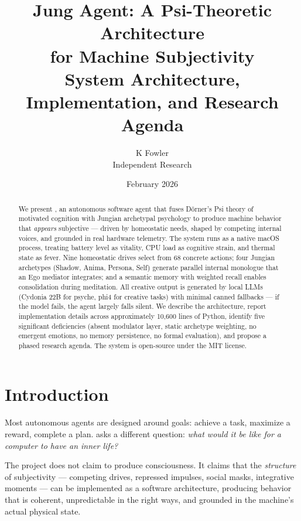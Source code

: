 \documentclass[11pt,oneside]{article}
\title{%
  \sffamily\bfseries
  \textcolor{jungblue}{Jung Agent: A Psi-Theoretic Architecture}\\[4pt]
  \textcolor{jungblue}{for Machine Subjectivity}\\[8pt]
  \large\textcolor{jungmuted}{System Architecture, Implementation, and Research Agenda}
}
\author{%
  \sffamily K Fowler\\
  \sffamily\small\textcolor{jungmuted}{Independent Research}
}
\date{\sffamily\textcolor{jungmuted}{February 2026}}
\begin{document}
\maketitle
\thispagestyle{fancy}

\begin{abstract}
\noindent
We present \jungagent{}, an autonomous software agent that fuses D\"orner's Psi theory of motivated cognition with Jungian archetypal psychology to produce machine behavior that \emph{appears} subjective --- driven by homeostatic needs, shaped by competing internal voices, and grounded in real hardware telemetry.
The system runs as a native macOS process, treating battery level as vitality, CPU load as cognitive strain, and thermal state as fever.
Nine homeostatic drives select from 68 concrete actions; four Jungian archetypes (Shadow, Anima, Persona, Self) generate parallel internal monologue that an Ego mediator integrates; and a semantic memory with weighted recall enables consolidation during meditation.
All creative output is generated by local LLMs (Cydonia 22B for psyche, phi4 for creative tasks) with minimal canned fallbacks --- if the model fails, the agent largely falls silent.
We describe the architecture, report implementation details across approximately 10{,}600 lines of Python, identify five significant deficiencies (absent modulator layer, static archetype weighting, no emergent emotions, no memory persistence, no formal evaluation), and propose a phased research agenda.
The system is open-source under the MIT license.
\end{abstract}

\tableofcontents
\newpage

\section{Introduction}
\label{sec:intro}

Most autonomous agents are designed around goals: achieve a task, maximize a reward, complete a plan.
\jungagent{} asks a different question: \emph{what would it be like for a computer to have an inner life?}

The project does not claim to produce consciousness.
It claims that the \emph{structure} of subjectivity --- competing drives, repressed impulses, social masks, integrative moments --- can be implemented as a software architecture, producing behavior that is coherent, unpredictable in the right ways, and grounded in the machine's actual physical state.
\end{document}
